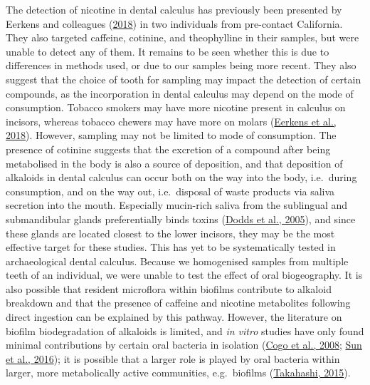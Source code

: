\documentclass[
  b5paper,
]{book}
\begin{document}
The detection of nicotine in dental calculus has previously been
presented by Eerkens and colleagues
(\protect\hyperlink{ref-eerkensDentalCalculus2018}{2018}) in two
individuals from pre-contact California. They also targeted caffeine,
cotinine, and theophylline in their samples, but were unable to detect
any of them. It remains to be seen whether this is due to differences in
methods used, or due to our samples being more recent. They also suggest
that the choice of tooth for sampling may impact the detection of
certain compounds, as the incorporation in dental calculus may depend on
the mode of consumption. Tobacco smokers may have more nicotine present
in calculus on incisors, whereas tobacco chewers may have more on molars
(\protect\hyperlink{ref-eerkensDentalCalculus2018}{Eerkens et al.,
2018}). However, sampling may not be limited to mode of consumption. The
presence of cotinine suggests that the excretion of a compound after
being metabolised in the body is also a source of deposition, and that
deposition of alkaloids in dental calculus can occur both on the way
into the body, i.e.~during consumption, and on the way out,
i.e.~disposal of waste products via saliva secretion into the mouth.
Especially mucin-rich saliva from the sublingual and submandibular
glands preferentially binds toxins
(\protect\hyperlink{ref-doddsHealthBenefits2005}{Dodds et al., 2005}),
and since these glands are located closest to the lower incisors, they
may be the most effective target for these studies. This has yet to be
systematically tested in archaeological dental calculus. Because we
homogenised samples from multiple teeth of an individual, we were unable
to test the effect of oral biogeography. It is also possible that
resident microflora within biofilms contribute to alkaloid breakdown and
that the presence of caffeine and nicotine metabolites following direct
ingestion can be explained by this pathway. However, the literature on
biofilm biodegradation of alkaloids is limited, and \emph{in vitro}
studies have only found minimal contributions by certain oral bacteria
in isolation (\protect\hyperlink{ref-cogoVitroEvaluation2008}{Cogo et
al., 2008}; \protect\hyperlink{ref-sunMetabolomicsEvaluation2016}{Sun et
al., 2016}); it is possible that a larger role is played by oral
bacteria within larger, more metabolically active communities,
e.g.~biofilms
(\protect\hyperlink{ref-takahashiOralMicrobiome2015}{Takahashi, 2015}).
\end{document}
